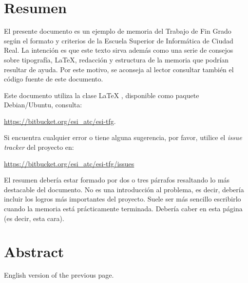 \chapter{Resumen}

El presente documento es un ejemplo de memoria del Trabajo de Fin Grado según el
formato y criterios de la Escuela Superior de Informática de Ciudad Real. La
intención es que este texto sirva además como una serie de consejos sobre
tipografía, \LaTeX, redacción y estructura de la memoria que podrían resultar de
ayuda. Por este motivo, se aconseja al lector consultar también el código fuente
de este documento.

Este documento utiliza la clase \LaTeX{} \esitfg{}, disponible como paquete
Debian/Ubuntu, consulta:

 \url{https://bitbucket.org/esi_atc/esi-tfg}.

Si encuentra cualquier error o tiene alguna sugerencia, por favor, utilice
el \emph{issue tracker} del proyecto \esitfg{} en:

\url{https://bitbucket.org/esi_atc/esi-tfg/issues}

El resumen debería estar formado por dos o tres párrafos resaltando lo más
destacable del documento. No es una introducción al problema, es decir, debería
incluir los logros más importantes del proyecto. Suele ser más sencillo
escribirlo cuando la memoria está prácticamente terminada. Debería caber en esta
página (es decir, esta cara).


\chapter{Abstract}

English version of the previous page.

